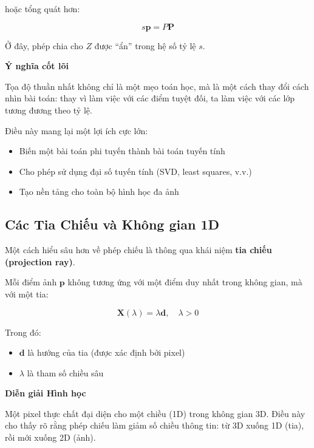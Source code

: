hoặc tổng quát hơn:

\[
s \mathbf{p} = P \mathbf{P}
\]

Ở đây, phép chia cho $Z$ được “ẩn” trong hệ số tỷ lệ $s$.

\begin{mdframed}[style=infobox]
	\textbf{Ý nghĩa cốt lõi}
	
	Tọa độ thuần nhất không chỉ là một mẹo toán học, mà là một cách thay đổi cách nhìn bài toán: thay vì làm việc với các điểm tuyệt đối, ta làm việc với các lớp tương đương theo tỷ lệ.
\end{mdframed}

Điều này mang lại một lợi ích cực lớn:

\begin{itemize}
	\item Biến một bài toán phi tuyến thành bài toán tuyến tính
	\item Cho phép sử dụng đại số tuyến tính (SVD, least squares, v.v.)
	\item Tạo nền tảng cho toàn bộ hình học đa ảnh
\end{itemize}

\subsection{Các Tia Chiếu và Không gian 1D}
\label{subsec:projection_rays}

Một cách hiểu sâu hơn về phép chiếu là thông qua khái niệm \textbf{tia chiếu (projection ray)}.

Mỗi điểm ảnh $\mathbf{p}$ không tương ứng với một điểm duy nhất trong không gian, mà với một tia:

\[
\mathbf{X}(\lambda) = \lambda \mathbf{d}, \quad \lambda > 0
\]

Trong đó:
\begin{itemize}
	\item $\mathbf{d}$ là hướng của tia (được xác định bởi pixel)
	\item $\lambda$ là tham số chiều sâu
\end{itemize}

\begin{mdframed}[style=infobox]
	\textbf{Diễn giải Hình học}
	
	Một pixel thực chất đại diện cho một chiều (1D) trong không gian 3D. Điều này cho thấy rõ rằng phép chiếu làm giảm số chiều thông tin: từ 3D xuống 1D (tia), rồi mới xuống 2D (ảnh).
\end{mdframed}


